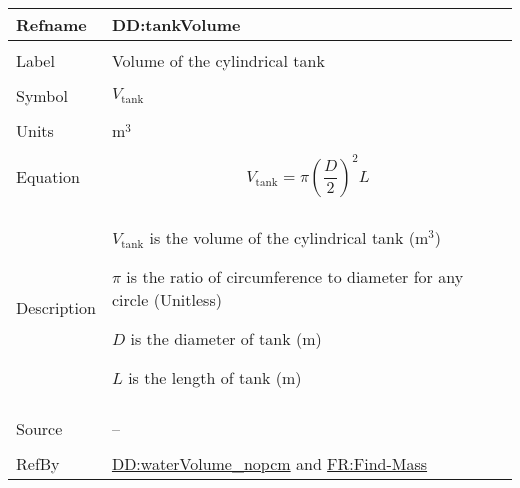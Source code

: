 \documentclass[12pt]{article}
\begin{document}
\vspace{\baselineskip}
\noindent
\begin{minipage}{\textwidth}
\begin{tabular}{>{\raggedright}p{}>{\raggedright\arraybackslash}p{}}
\toprule \textbf{Refname} & \textbf{DD:tankVolume}
\label{DD:tankVolume}
\\ \midrule \\
Label & Volume of the cylindrical tank
        
\\ \midrule \\
Symbol & ${V_{\text{tank}}}$
         
\\ \midrule \\
Units & ${\text{m}^{3}}$
        
\\ \midrule \\
Equation & \begin{displaymath}
           {V_{\text{tank}}}=π \left(\frac{D}{2}\right)^{2} L
           \end{displaymath}
\\ \midrule \\
Description & \begin{symbDescription}
              \item{${V_{\text{tank}}}$ is the volume of the cylindrical tank (${\text{m}^{3}}$)}
              \item{$π$ is the ratio of circumference to diameter for any circle (Unitless)}
              \item{$D$ is the diameter of tank (${\text{m}}$)}
              \item{$L$ is the length of tank (${\text{m}}$)}
              \end{symbDescription}
\\ \midrule \\
Source & --
         
\\ \midrule \\
RefBy & \hyperref[DD:waterVolume.nopcm]{DD:waterVolume\_nopcm} and \hyperref[findMass]{FR:Find-Mass}
        
\\ \bottomrule
\end{tabular}
\end{minipage}

\end{document}
